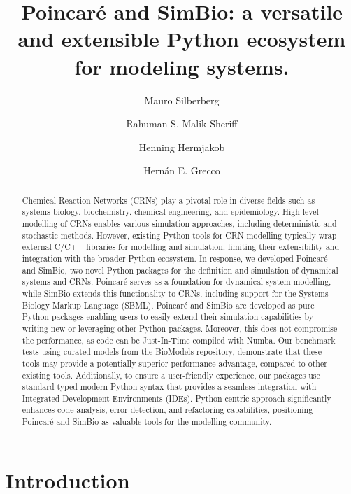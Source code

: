 \documentclass[
  letterpaper,
  DIV=11,
  numbers=noendperiod]{scrartcl}
\title{Poincaré and SimBio: a versatile and extensible Python ecosystem
for modeling systems.}
\author{Mauro Silberberg \and Rahuman S. Malik-Sheriff \and Henning
Hermjakob \and Hernán E. Grecco}
\date{}
\begin{document}
\maketitle
\begin{abstract}
Chemical Reaction Networks (CRNs) play a pivotal role in diverse fields
such as systems biology, biochemistry, chemical engineering, and
epidemiology. High-level modelling of CRNs enables various simulation
approaches, including deterministic and stochastic methods. However,
existing Python tools for CRN modelling typically wrap external C/C++
libraries for modelling and simulation, limiting their extensibility and
integration with the broader Python ecosystem. In response, we developed
Poincaré and SimBio, two novel Python packages for the definition and
simulation of dynamical systems and CRNs. Poincaré serves as a
foundation for dynamical system modelling, while SimBio extends this
functionality to CRNs, including support for the Systems Biology Markup
Language (SBML). Poincaré and SimBio are developed as pure Python
packages enabling users to easily extend their simulation capabilities
by writing new or leveraging other Python packages. Moreover, this does
not compromise the performance, as code can be Just-In-Time compiled
with Numba. Our benchmark tests using curated models from the BioModels
repository, demonstrate that these tools may provide a potentially
superior performance advantage, compared to other existing tools.
Additionally, to ensure a user-friendly experience, our packages use
standard typed modern Python syntax that provides a seamless integration
with Integrated Development Environments (IDEs). Python-centric approach
significantly enhances code analysis, error detection, and refactoring
capabilities, positioning Poincaré and SimBio as valuable tools for the
modelling community.
\end{abstract}
\ifdefined\Shaded\renewenvironment{Shaded}{\begin{tcolorbox}[sharp corners, frame hidden, interior hidden, borderline west={3pt}{0pt}{shadecolor}, breakable, boxrule=0pt, enhanced]}{\end{tcolorbox}}\fi

\hypertarget{introduction}{%
\section{Introduction}\label{introduction}}
\end{document}
